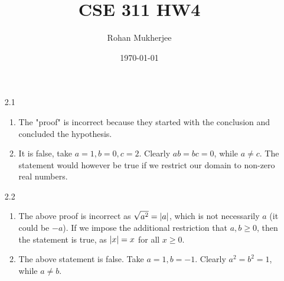 \documentclass[12pt]{article}
\title{CSE 311 HW4}
\date{\today}
\author{Rohan Mukherjee}
\theoremstyle{definition}
\theoremstyle{remark}
\begin{document}
	\maketitle
	\begin{enumerate}[leftmargin=\labelsep]
		\item[2.1]
		\begin{enumerate}
			\item 
			The "proof" is incorrect because they started with the conclusion and concluded the hypothesis.
			\item It is false, take $a = 1, b = 0, c = 2$. Clearly $ab = bc = 0$, while $a \neq c$. The statement would however be true if we restrict our domain to non-zero real numbers.
		\end{enumerate}
		\item[2.2]
		\begin{enumerate}
			\item The above proof is incorrect as $\sqrt{a^2} = \abs{a}$, which is not necessarily $a$ (it could be $-a$). If we impose the additional restriction that $a, b \geq 0$, then the statement is true, as $\abs{x} = x$ for all $x \geq 0$.
			\item The above statement is false. Take $a = 1, b = -1$. Clearly $a^2 = b^2 = 1$, while $a \neq b$.
		\end{enumerate}
	

\end{enumerate}
\end{document}
